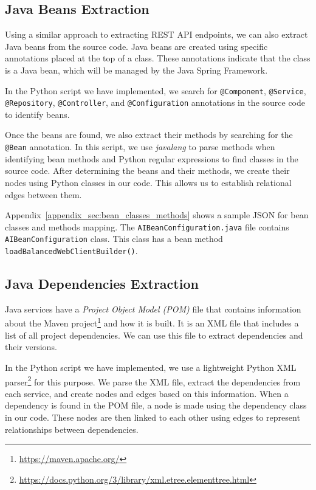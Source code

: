\subsection{Java Beans Extraction}

Using a similar approach to extracting REST API endpoints, we can also extract Java beans from the source code. Java beans are created using specific annotations placed at the top of a class. These annotations indicate that the class is a Java bean, which will be managed by the Java Spring Framework.

In the Python script we have implemented, we search for \texttt{@Component}, \texttt{@Service}, \texttt{@Repository}, \texttt{@Controller}, and \texttt{@Configuration} annotations in the source code to identify beans.

Once the beans are found, we also extract their methods by searching for the \texttt{@Bean} annotation. In this script, we use \textit{javalang} to parse methods when identifying bean methods and Python regular expressions to find classes in the source code. After determining the beans and their methods, we create their nodes using Python classes in our code. This allows us to establish relational edges between them.

Appendix~\ref{appendix_sec:bean_classes_methods} shows a sample JSON for bean classes and methods mapping. The \texttt{AIBeanConfiguration.java} file contains \texttt{AIBeanConfiguration} class. This class has a bean method \texttt{loadBalancedWebClientBuilder()}.

\subsection{Java Dependencies Extraction}

Java services have a \textit{Project Object Model (POM)} file that contains information about the Maven project\footnote{\url{https://maven.apache.org/}} and how it is built. It is an XML file that includes a list of all project dependencies. We can use this file to extract dependencies and their versions.

In the Python script we have implemented, we use a lightweight Python XML parser\footnote{\url{https://docs.python.org/3/library/xml.etree.elementtree.html}} for this purpose. We parse the XML file, extract the dependencies from each service, and create nodes and edges based on this information. When a dependency is found in the POM file, a node is made using the dependency class in our code. These nodes are then linked to each other using edges to represent relationships between dependencies.

